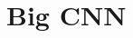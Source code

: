 \documentclass{report}
\theoremstyle{definition}
\theoremstyle{remark}
\begin{document}
\section{Big CNN}
\end{document}
